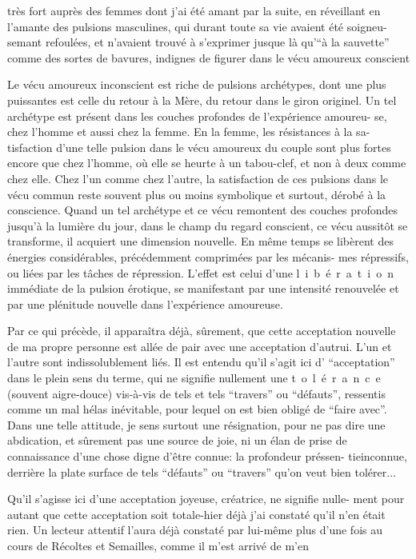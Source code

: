 très fort auprès des femmes dont j'ai été amant par la suite, en réveillant en
l'amante des pulsions masculines, qui durant toute sa vie avaient été soigneu-\linebreak
semant refoulées, et n'avaient trouvé à s'exprimer jusque là qu'``à la sauvette''
comme des sortes de bavures, indignes de figurer dans le vécu amoureux conscient

Le vécu amoureux inconscient est riche de pulsions archétypes, dont une 
plus puissantes est celle du retour à la Mère, du retour dans le giron originel.
Un tel archétype est présent dans les couches profondes de l'expérience amoureu-\linebreak
se, chez l'homme et aussi chez la femme. En la femme, les résistances à la sa-\linebreak
tisfaction d'une telle pulsion dans le vécu amoureux du couple sont plus fortes
encore que chez l'homme, où elle se heurte à un tabou-clef, et non à deux comme
chez elle. Chez l'un comme chez l'autre, la satisfaction de ces pulsions \unsure{-}dans
le vécu commun reste souvent plus ou moins symbolique et surtout,
dérobé à la conscience. Quand un tel archétype et ce vécu remontent des couches
profondes jusqu'à la lumière du jour, dans le champ du regard conscient, ce
vécu aussitôt se transforme, il acquiert une dimension nouvelle. En même temps
se libèrent des énergies considérables, précédemment comprimées par les mécanis-\linebreak
mes répressifs, ou liées par les tâches de répression. L'effet est celui d'une
\mbox{l i b é r a t i o n} immédiate de la pulsion érotique, se manifestant par une
intensité renouvelée et par une plénitude nouvelle dans l'expérience amoureuse.

Par ce qui précède, il apparaîtra déjà, sûrement, que cette acceptation
nouvelle de ma propre personne est allée de pair avec une acceptation d'autrui.
L'un et l'autre sont indissolublement liés. Il est entendu qu'il s'agit ici
d' ``acceptation'' dans le plein sens du terme, qui ne signifie nullement une
\mbox{t o l é r a n c e} (souvent aigre-douce) vis-à-vis de tels et tels ``travers'' ou
``défauts'', ressentis comme un mal hélas inévitable, pour lequel on est bien
obligé de ``faire avec''. Dans une telle attitude, je sens surtout une résignation,
pour ne pas dire une abdication, et sûrement pas une source de joie, ni un élan
de prise de connaissance d'une chose digne d'être connue: la profondeur préssen-\linebreak
tie\inserted{,}inconnue, derrière la plate surface de tels ``défauts'' ou ``travers'' qu'on
veut bien tolérer...

Qu'il s'agisse ici d'une acceptation joyeuse, créatrice, ne signifie nulle-\linebreak
ment pour autant que cette acceptation soit totale-hier déjà j'ai constaté qu'il
n'en était rien. Un lecteur attentif l'aura déjà constaté par lui-même plus d'une
fois au cours de Récoltes et Semailles, comme il m'est arrivé de m'en
\margin{\unsure{-}}
